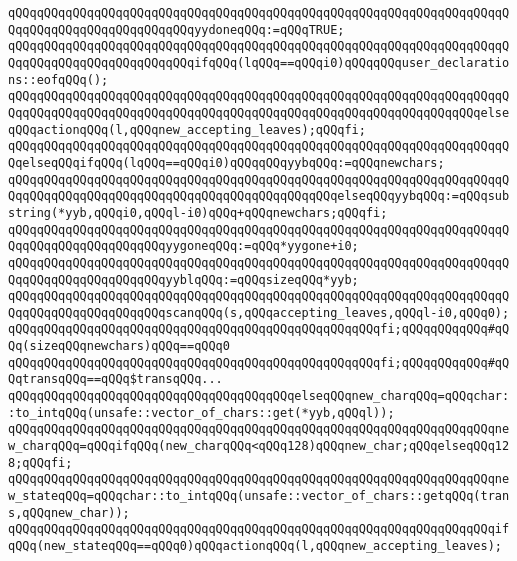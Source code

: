 \verb|qQQqqQQqqQQqqQQqqQQqqQQqqQQqqQQqqQQqqQQqqQQqqQQqqQQqqQQqqQQqqQQqqQQqqQQqqQQqqQQqqQQqqQQqqQQqqQQqyydoneqQQq:=qQQqTRUE;|\newline
\verb|qQQqqQQqqQQqqQQqqQQqqQQqqQQqqQQqqQQqqQQqqQQqqQQqqQQqqQQqqQQqqQQqqQQqqQQqqQQqqQQqqQQqqQQqqQQqqQQqifqQQq(lqQQq==qQQqi0)qQQqqQQquser_declarations::eofqQQq();|\newline
\verb|qQQqqQQqqQQqqQQqqQQqqQQqqQQqqQQqqQQqqQQqqQQqqQQqqQQqqQQqqQQqqQQqqQQqqQQqqQQqqQQqqQQqqQQqqQQqqQQqqQQqqQQqqQQqqQQqqQQqqQQqqQQqqQQqqQQqqQQqelseqQQqactionqQQq(l,qQQqnew_accepting_leaves);qQQqfi;|\newline
\verb|qQQqqQQqqQQqqQQqqQQqqQQqqQQqqQQqqQQqqQQqqQQqqQQqqQQqqQQqqQQqqQQqqQQqqQQqelseqQQqifqQQq(lqQQq==qQQqi0)qQQqqQQqyybqQQq:=qQQqnewchars;|\newline
\verb|qQQqqQQqqQQqqQQqqQQqqQQqqQQqqQQqqQQqqQQqqQQqqQQqqQQqqQQqqQQqqQQqqQQqqQQqqQQqqQQqqQQqqQQqqQQqqQQqqQQqqQQqqQQqqQQqqQQqelseqQQqyybqQQq:=qQQqsubstring(*yyb,qQQqi0,qQQql-i0)qQQq+qQQqnewchars;qQQqfi;|\newline
\verb|qQQqqQQqqQQqqQQqqQQqqQQqqQQqqQQqqQQqqQQqqQQqqQQqqQQqqQQqqQQqqQQqqQQqqQQqqQQqqQQqqQQqqQQqqQQqyygoneqQQq:=qQQq*yygone+i0;|\newline
\verb|qQQqqQQqqQQqqQQqqQQqqQQqqQQqqQQqqQQqqQQqqQQqqQQqqQQqqQQqqQQqqQQqqQQqqQQqqQQqqQQqqQQqqQQqqQQqyyblqQQq:=qQQqsizeqQQq*yyb;|\newline
\verb|qQQqqQQqqQQqqQQqqQQqqQQqqQQqqQQqqQQqqQQqqQQqqQQqqQQqqQQqqQQqqQQqqQQqqQQqqQQqqQQqqQQqqQQqqQQqscanqQQq(s,qQQqaccepting_leaves,qQQql-i0,qQQq0);|\newline
\verb|qQQqqQQqqQQqqQQqqQQqqQQqqQQqqQQqqQQqqQQqqQQqqQQqqQQqfi;qQQqqQQqqQQq#qQQq(sizeqQQqnewchars)qQQq==qQQq0|\newline
\verb|qQQqqQQqqQQqqQQqqQQqqQQqqQQqqQQqqQQqqQQqqQQqqQQqqQQqfi;qQQqqQQqqQQq#qQQqtransqQQq==qQQq$transqQQq...|\newline
\verb|qQQqqQQqqQQqqQQqqQQqqQQqqQQqqQQqqQQqqQQqelseqQQqnew_charqQQq=qQQqchar::to_intqQQq(unsafe::vector_of_chars::get(*yyb,qQQql));|\newline
\verb|qQQqqQQqqQQqqQQqqQQqqQQqqQQqqQQqqQQqqQQqqQQqqQQqqQQqqQQqqQQqqQQqqQQqnew_charqQQq=qQQqifqQQq(new_charqQQq<qQQq128)qQQqnew_char;qQQqelseqQQq128;qQQqfi;|\newline
\verb|qQQqqQQqqQQqqQQqqQQqqQQqqQQqqQQqqQQqqQQqqQQqqQQqqQQqqQQqqQQqqQQqqQQqnew_stateqQQq=qQQqchar::to_intqQQq(unsafe::vector_of_chars::getqQQq(trans,qQQqnew_char));|\newline
\verb|qQQqqQQqqQQqqQQqqQQqqQQqqQQqqQQqqQQqqQQqqQQqqQQqqQQqqQQqqQQqqQQqqQQqifqQQq(new_stateqQQq==qQQq0)qQQqactionqQQq(l,qQQqnew_accepting_leaves);|\newline
